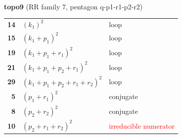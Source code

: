 \documentclass[10pt]{article}
\begin{document}
\begin{minipage}[t]{0.48\textwidth}
{}\\[2mm]\textbf{topo9} (RR family 7, pentagon q-p1-r1-p2-r2)\\[2pt]{\footnotesize\begin{tabular}{@{}r@{\ \ }l@{\ \ }l@{}}\textbf{14} & $(k_1)^2$ & loop\\
\textbf{15} & $(k_1+p_1)^2$ & loop\\
\textbf{19} & $(k_1+p_1+r_1)^2$ & loop\\
\textbf{21} & $(k_1+p_1+p_2+r_1)^2$ & loop\\
\textbf{29} & $(k_1+p_1+p_2+r_1+r_2)^2$ & loop\\
\textbf{5} & $(p_1+r_1)^2$ & conjugate\\
\textbf{8} & $(p_2+r_2)^2$ & conjugate\\
\textbf{10} & $(p_2+r_1+r_2)^2$ & \textcolor{red}{irreducible numerator}\\\end{tabular}}\end{minipage}\hfill%
\end{document}
